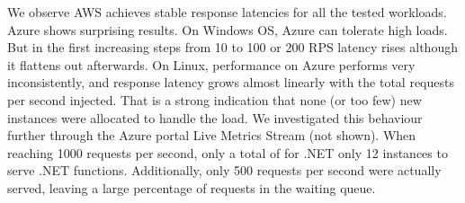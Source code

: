 We observe \gls{AWS} achieves stable response latencies for all the tested workloads. 
Azure shows surprising results. 
On Windows OS, Azure can tolerate high loads.
But in the first increasing steps from 10 to 100 or 200 RPS latency rises although it flattens out afterwards. 
On Linux, performance on Azure performs very inconsistently, and response latency grows almost linearly with the total requests per second injected. 
That is a strong indication that none (or too few) new instances were allocated to handle the load. 
We investigated this behaviour further through the Azure portal Live Metrics Stream (not shown). 
When reaching 1000 requests per second, only a total of for .NET only 12 instances to serve .NET functions. %
Additionally, only 500 requests per second were actually served, leaving a large percentage of requests in the waiting queue.


